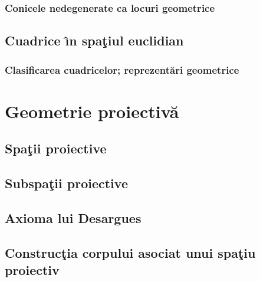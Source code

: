 \documentclass[12pt]{book}
\begin{document}
\subsection{Conicele nedegenerate ca locuri geometrice}

\section{Cuadrice \^{\i}n spa\c tiul euclidian}
\subsection{Clasificarea cuadricelor; reprezent\u ari geometrice}


\chapter{Geometrie proiectiv\u a }

\section{Spa\c tii proiective}

\section{Subspa\c tii proiective}

\section{Axioma lui Desargues}

\section{Construc\c tia corpului asociat unui spa\c tiu proiectiv}
\end{document}
